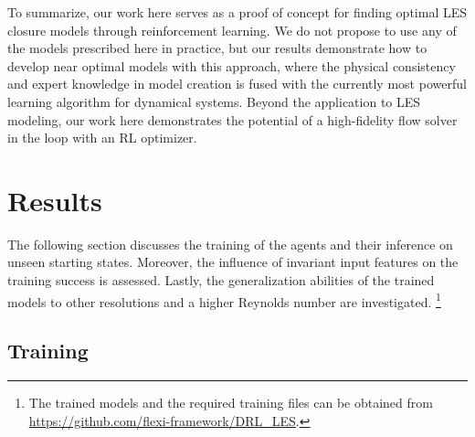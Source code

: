 To summarize, our work here serves as a proof of concept for finding optimal LES closure models through reinforcement learning.
We do not propose to use any of the models prescribed here in practice, but our results demonstrate how to develop near optimal models with this approach, where the physical consistency and expert knowledge in model creation is fused with the currently most powerful learning algorithm for dynamical systems.
Beyond the application to LES modeling, our work here demonstrates the potential of a high-fidelity flow solver in the loop with an RL optimizer.

\section{Results}
\label{sec:results}

The following section discusses the training of the agents and their inference on unseen starting states.
Moreover, the influence of invariant input features on the training success is assessed.
Lastly, the generalization abilities of the trained models to other resolutions and a higher Reynolds number are investigated.%
\footnote{The trained models and the required training files can be obtained from \url{https://github.com/flexi-framework/DRL_LES}.}

\subsection{Training}
\label{sec:results_training}

